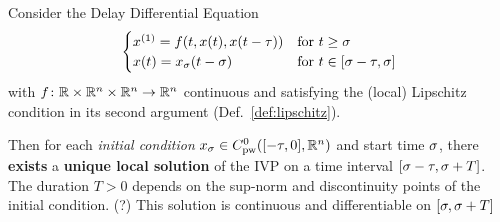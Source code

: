     \begin{theorem}\label{thm:solution-existence}
        Consider the Delay Differential Equation
        \begin{equation}
            \begin{cases}
                \D{x} = f(t,x(t),x(t-\tau)) & \text{for } t\geq\tzero\\
                x(t) = x_\tzero(t-\tzero)   & \text{for } t\in [\tzero-\tau,\tzero]
            \end{cases}
        \end{equation}
        with $f\colon\mathbb{R}\times\mathbb{R}^n\times\mathbb{R}^n\to\mathbb{R}^n$ continuous and satisfying the (local) Lipschitz condition in its second argument (Def.~\ref{def:lipschitz}).


        Then for each \emph{initial condition} $x_{\tzero}\in\statespace[\tau]$ and start time $\sigma$, there \textbf{exists} a \textbf{unique local solution} of the IVP on a time interval $[\sigma-\tau, \sigma+T]$. The duration $T>0$ depends on the sup-norm and discontinuity points of the initial condition. (?)
        This solution is continuous and differentiable on $[\sigma,\sigma+T]$
    \end{theorem}


